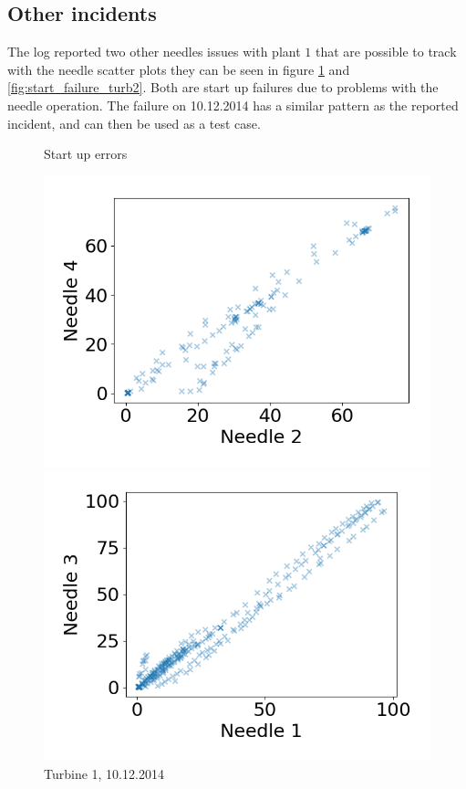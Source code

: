     \subsection{Other incidents}
        The log reported two other needles issues with plant $1$ that are possible to track with the needle scatter plots they can be seen in figure \ref{fig:start_failure_turb1} and \ref{fig:start_failure_turb2}. Both are start up failures due to problems with the needle operation. The failure on 10.12.2014 has a similar pattern as the reported incident, and can then be used as a test case.
        \begin{figure}[h!]
            \caption*{Start up errors}
            \begin{minipage}[b]{0.5\linewidth}
                \centering
                \includegraphics[width = \textwidth]{report/figures/data/turb1_n2_n4_scatter_start_failure_10122014.png}
                \caption{Turbine 1, 10.12.2014}
                \label{fig:start_failure_turb1}
            \end{minipage}
            \begin{minipage}[b]{0.5\linewidth}
                \centering
                \includegraphics[width = \textwidth]{report/figures/data/turb2_n1_n3_start_failure_25082016.png}

\end{minipage}
\end{figure}
